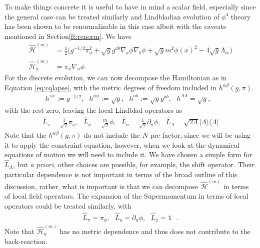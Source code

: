 \documentclass[aps,pra,showpacs,citeautoscript,amsmath,amssymb,floatfix,superscriptaddress,bbm, verbatim,amsfonts,changes,11pt,nofootinbib,longbibliography]{revtex4-2}
\newcommand{\id}{\mathbb{1}}
\newcommand{\proj}[1]{|#1\rangle\!\langle#1|}
\def\s{\,\,\,\,}
\def\L{{\hat{L}}}
\def\gfdet{\sqrt{g}}
\def\qham{\hat{\mathcal H}^{(m)}} %
\def\qmom{\hat{\mathcal{H}}^{(m)}}
\def\ab{^{\alpha\beta}}
\def\gpi{(g,\pi)}
\def\xd{}%
\begin{document}
To make things concrete it is useful to have in mind a scalar field, especially since the general case can be treated similarly and Lindbladian evolution of $\phi^4$ theory has been shown to be renormalizable in this case \cite{baidya2017renormalization}\label{par:caveats} albeit with the caveats mentioned in Section\ref{ft:renorm}. %
We have \cite{smear_foot}
\begin{align}
\qham
&=\frac{1}{2}\Big({g}^{-1/2}\pi_\phi^2+\sqrt{g}g^{ab}\nabla_a\phi\nabla_b\phi+\sqrt{g}m^2\phi(x)^2
-4\sqrt{g}\Lambda_{cc}\Big)
\label{eq:scalarTNN}\\
\qmom_a
&=\pi_\phi\nabla_a\phi
\end{align}
For the discrete evolution, we can now decompose the Hamiltonian as in Equation \eqref{eq:cqlapse}, with the metric degrees of freedom included in
$h\ab\gpi$. 
\begin{align}
h^{\pi\pi}:= 
g^{-1/2}, \s
h^{\phi\phi}:= 
\gfdet,\s
h^{ab}:=\gfdet g^{ab}
,\s
h^{\Lambda\Lambda}=\sqrt{g}
,\s
\label{eq:hlapse}
\end{align} 
with the rest zero, leaving the local Lindblad operators as
\begin{align}
\L_\pi\xd=\frac{1}{\sqrt{2}}\pi_\phi\xd,\s
\L_\phi\xd=\frac{m}{\sqrt{2}}\phi\xd, 
\s \L_a\xd=\frac{1}{\sqrt{2}}\partial_a\phi\xd
,\s %
\L_{\Lambda}={\sqrt{2\Lambda}}\proj{\Lambda}
\label{eq:scalarL}
\end{align}
Note that the $h\ab\gpi$ do not include the $N$ pre-factor, since we will be using it to apply the constraint equation, however, when we look at the dynamical equations of motion we will need to include it. We have chosen a simple form for $\L_{\Lambda}$, but {\it a priori}, other choices are possible, for example, the shift operator.
Their particular dependence is not important in terms of the broad outline of this discussion, rather, what is important is that we can decompose 
$\qham\xd$
in terms of local field operators. The expansion of the Supermomentum in terms of local operators could be treated similarly, 
with 
\begin{align}
\L_{\pi}\xd=\pi_\phi\xd,\s \L_{a}\xd=\partial_a\phi\xd
,\s \L_\id=\id\s.
\end{align}
Note that $\qmom_a\xd$ has no metric dependence and thus does not contribute to the back-reaction.%
\end{document}
